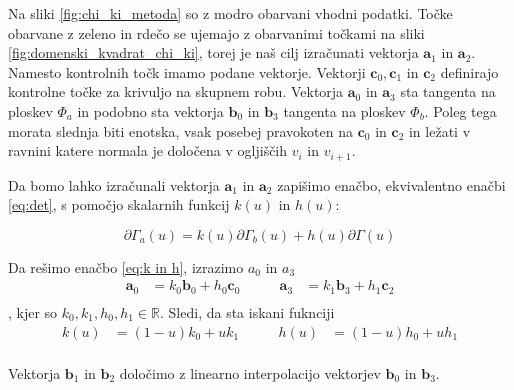 \documentclass[a4paper,12pt]{article}
\newcommand{\tbf}{\textbf}
\begin{document}
	Na sliki \ref{fig:chi_ki_metoda} so z modro obarvani vhodni podatki.
	Točke obarvane z zeleno in rdečo se ujemajo z obarvanimi točkami na sliki 
	\ref{fig:domenski_kvadrat_chi_ki}, torej je naš cilj izračunati vektorja $\textbf{a}_1$ in 
	$\textbf{a}_2$.  Namesto kontrolnih točk imamo podane vektorje. Vektorji $\textbf{c}_0, \textbf{c}_1$ in $\textbf{c}_2$
	definirajo kontrolne točke za krivuljo na skupnem robu. Vektorja $\textbf{a}_0$ in $\textbf{a}_3$ 
	sta tangenta na ploskev $\Phi_a$ in podobno sta vektorja $\textbf{b}_0$ in $\textbf{b}_3$ tangenta 
	na ploskev $\Phi_b$. Poleg tega morata slednja biti enotska,
	vsak posebej pravokoten na $\textbf{c}_0$ in $\textbf{c}_2$ in ležati v ravnini katere normala je določena
	v ogljiščih $v_i$ in $v_{i + 1}$.

	Da bomo lahko izračunali vektorja $\textbf{a}_1$ in $\textbf{a}_2$ zapišimo enačbo, ekvivalentno
	enačbi \ref{eq:det}, s pomočjo skalarnih funkcij $k(u)$ in $h(u)$:

	\begin{equation}
		\label{eq:k in h}
		\partial \Gamma_a(u) = k(u) \partial \Gamma_b(u) + h(u) \partial \Gamma(u)
	\end{equation}
	
	Da rešimo enačbo \ref{eq:k in h}, izrazimo $a_0$ in $a_3$
	\begin{equation*}
		\begin{split}
			\tbf{a}_0 &= k_0\tbf{b}_0 + h_0\tbf{c}_0 \\
		\end{split}
		\quad\quad
		\begin{split}
			\tbf{a}_3 &= k_1\tbf{b}_3 + h_1\tbf{c}_2 \\
		\end{split}
	\end{equation*},
	kjer so $k_0, k_1, h_0, h_1 \in \mathbb{R}$. Sledi, da sta iskani fuknciji
	\begin{equation*}
		\begin{split}
			k(u) &= (1 - u) k_0 + u k_1 \\
		\end{split}
		\quad\quad
		\begin{split}
			h(u) &= (1 - u) h_0 + u h_1 \\
		\end{split}
	\end{equation*}

	Vektorja $\textbf{b}_1$ in $\textbf{b}_2$ določimo z linearno interpolacijo 
	vektorjev $\textbf{b}_0$ in $\textbf{b}_3$.
\end{document}
